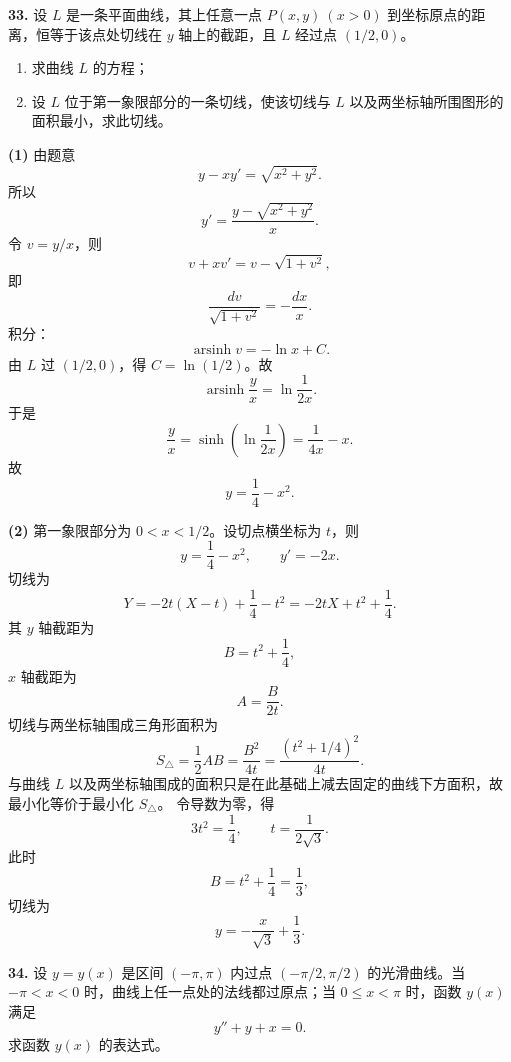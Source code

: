 \begin{problemblock}
\textbf{33.} 设 \(L\) 是一条平面曲线，其上任意一点 \(P(x,y)\ (x>0)\) 到坐标原点的距离，恒等于该点处切线在 \(y\) 轴上的截距，且 \(L\) 经过点 \((1/2,0)\)。
\begin{enumerate}
\item 求曲线 \(L\) 的方程；
\item 设 \(L\) 位于第一象限部分的一条切线，使该切线与 \(L\) 以及两坐标轴所围图形的面积最小，求此切线。
\end{enumerate}
\end{problemblock}

\begin{solutionblock}
\textbf{(1)} 由题意
\[
y-xy'=\sqrt{x^2+y^2}.
\]
所以
\[
y'=\frac{y-\sqrt{x^2+y^2}}{x}.
\]
令 \(v=y/x\)，则
\[
v+xv'=v-\sqrt{1+v^2},
\]
即
\[
\frac{dv}{\sqrt{1+v^2}}=-\frac{dx}{x}.
\]
积分：
\[
\operatorname{arsinh}v=-\ln x+C.
\]
由 \(L\) 过 \((1/2,0)\)，得 \(C=\ln(1/2)\)。故
\[
\operatorname{arsinh}\frac{y}{x}=\ln\frac{1}{2x}.
\]
于是
\[
\frac{y}{x}=\sinh\left(\ln\frac1{2x}\right)
=\frac{1}{4x}-x.
\]
故
\[
\boxed{y=\frac14-x^2}.
\]

\textbf{(2)} 第一象限部分为 \(0<x<1/2\)。设切点横坐标为 \(t\)，则
\[
y=\frac14-x^2,\qquad y'=-2x.
\]
切线为
\[
Y=-2t(X-t)+\frac14-t^2=-2tX+t^2+\frac14.
\]
其 \(y\) 轴截距为
\[
B=t^2+\frac14,
\]
\(x\) 轴截距为
\[
A=\frac{B}{2t}.
\]
切线与两坐标轴围成三角形面积为
\[
S_{\triangle}=\frac12AB=\frac{B^2}{4t}
=\frac{(t^2+1/4)^2}{4t}.
\]
与曲线 \(L\) 以及两坐标轴围成的面积只是在此基础上减去固定的曲线下方面积，故最小化等价于最小化 \(S_{\triangle}\)。
令导数为零，得
\[
3t^2=\frac14,\qquad t=\frac{1}{2\sqrt3}.
\]
此时
\[
B=t^2+\frac14=\frac13,
\]
切线为
\[
\boxed{y=-\frac{x}{\sqrt3}+\frac13}.
\]
\end{solutionblock}

\begin{problemblock}
\textbf{34.} 设 \(y=y(x)\) 是区间 \((-\pi,\pi)\) 内过点 \((-\pi/2,\pi/2)\) 的光滑曲线。当 \(-\pi<x<0\) 时，曲线上任一点处的法线都过原点；当 \(0\le x<\pi\) 时，函数 \(y(x)\) 满足
\[
y''+y+x=0.
\]
求函数 \(y(x)\) 的表达式。
\end{problemblock}

